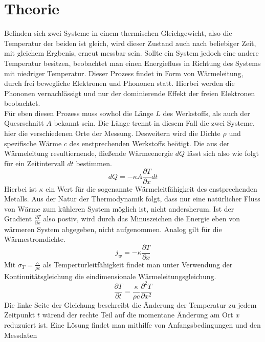 \section{Theorie}
Befinden sich zwei Systeme in einem thermischen Gleichgewicht, also die Temperatur der beiden ist gleich, 
wird dieser Zustand auch nach beliebiger Zeit, mit gleichem Ergbenis, erneut messbar sein. Sollte ein System jedoch eine andere Temperatur besitzen, beobachtet 
man einen Energiefluss in Richtung des Systems mit niedriger Temperatur. Dieser Prozess findet in Form von Wärmeleitung, durch frei bewegliche Elektronen und Phononen statt.
Hierbei werden die Phononen vernachlässigt und nur der dominierende Effekt der freien Elektronen beobachtet.
\\
\newline
Für eben diesen Prozess muss sowhol die Länge $L$ des Werkstoffs, als auch der Quesrschnitt $A$ bekannt sein. Die Länge trennt in diesem Fall die zwei Systeme,
hier die verschiedenen Orte der Messung. Desweitern wird die Dichte $\rho$ und spezifische Wärme $c$ des enstprechenden Werkstoffs beötigt.
Die aus der Wärmeleitung resultiernende, fließende Wärmeenergie $dQ$ lässt sich also wie folgt für ein Zeitintervall $dt$ bestimmen.
\begin{equation}
    \label{eqn:itsHeadacheTimeYeeeay}
    dQ = -\kappa A \frac{\partial T}{\partial x} dt 
\end{equation}
Hierbei ist $\kappa$ ein Wert für die sogenannte Wärmeleitfähigkeit des enstprechenden Metalls. Aus der Natur der Thermodynamik 
folgt, dass nur eine natürlicher Fluss von Wärme zum kühleren System möglich ist, nicht andersherum. Ist der Gradient $\frac{\partial T}{\partial x}$ also postiv, 
wird durch das Minuszeichen die Energie eben von wärmeren System abgegeben, nicht aufgenommen.
Analog gilt für die Wärmestromdichte.
\begin{equation}
    \label{eqn:stromdichte}
    j_w = -\kappa \frac{\partial T}{\partial x}
\end{equation}
Mit $ \sigma_T = \frac{\kappa}{\rho c}$ als Temperturleitfähigkeit findet man unter Verwendung der Kontinuitätsgleichung die eindimensionale Wärmeleitungsgleichung.
\begin{equation}
    \label{eqn:1dim}
    \frac{\partial T}{\partial t} = \frac{\kappa}{\rho c} \frac{\partial^2 T}{\partial x^2}
\end{equation}
Die linke Seite der Gleichung beschreibt die Änderung der Temperatur zu jedem Zeitpunkt $t$ wärend der rechte Teil 
auf die momentane Änderung am Ort $x$ reduzuiert ist. Eine Lösung findet man mithilfe von Anfangsbedingungen und den Messdaten 
